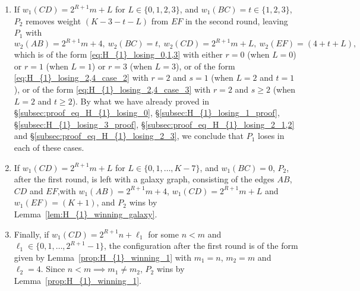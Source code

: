\documentclass[11pt,reqno]{amsart}
\theoremstyle{definition}
\theoremstyle{definition}
\begin{document}
\begin{enumerate}
\begin{enumerate}
\item If $w_{1}(CD)=2^{R+1}m+L$ for $L \in \{0,1,2,3\}$, and $w_{1}(BC)=t\in\{1,2,3\}$, $P_{2}$ removes weight $(K-3-t-L)$ from $EF$ in the second round, leaving $P_{1}$ with
\begin{equation}
w_{2}(AB)=2^{R+1}m+4,\ w_{2}(BC)=t,\ w_{2}(CD)=2^{R+1}m+L,\ w_{2}(EF)=(4+t+L),\nonumber
\end{equation}
which is of the form \eqref{eq:H_{1}_losing_0,1,3} with either $r=0$ (when $L=0$) or $r=1$ (when $L=1$) or $r=3$ (when $L=3$), or of the form \eqref{eq:H_{1}_losing_2,4_case_2} with $r=2$ and $s=1$ (when $L=2$ and $t=1$), or of the form \eqref{eq:H_{1}_losing_2,4_case_3} with $r=2$ and $s\geqslant 2$ (when $L=2$ and $t \geqslant 2$). By what we have already proved in \S\ref{subsec:proof_eq_H_{1}_losing_0}, \S\ref{subsec:H_{1}_losing_1_proof}, \S\ref{subsec:H_{1}_losing_3_proof}, \S\ref{subsec:proof_eq_H_{1}_losing_2_1,2} and \S\ref{subsec:proof_eq_H_{1}_losing_2_3}, we conclude that $P_{1}$ loses in each of these cases.

\item If $w_{1}(CD)=2^{R+1}m+L$ for $L \in \{0,1,\ldots,K-7\}$, and $w_{1}(BC)=0$, $P_{2}$, after the first round, is left with a galaxy graph, consisting of the edges $AB$, $CD$ and $EF$,with $w_{1}(AB)=2^{R+1}m+4$, $w_{1}(CD)=2^{R+1}m+L$ and $w_{1}(EF)=(K+1)$, and $P_{2}$ wins by Lemma~\ref{lem:H_{1}_winning_galaxy}.

\item Finally, if $w_{1}(CD)=2^{R+1}n+\ell_{1}$ for some $n<m$ and $\ell_{1}\in\{0,1,\ldots,2^{R+1}-1\}$, the configuration after the first round is of the form given by Lemma~\ref{prop:H_{1}_winning_1} with $m_{1}=n$, $m_{2}=m$ and $\ell_{2}=4$. Since $n<m \implies m_{1}\neq m_{2}$, $P_{2}$ wins by Lemma~\ref{prop:H_{1}_winning_1}.
\end{enumerate}


\end{enumerate}
\end{document}
